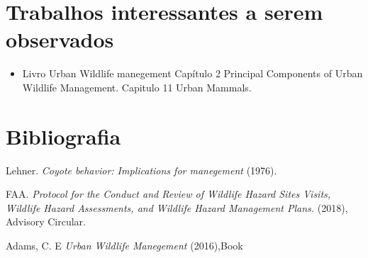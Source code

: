 \documentclass[a4paper,16,onecolumn]{article}
\begin{document}

\section{Trabalhos interessantes a serem observados}
\begin{itemize}
\item Livro Urban Wildlife manegement
\subitem Capítulo 2 Principal Components of Urban Wildlife Management.
\subitem Capitulo 11 Urban Mammals.

\end{itemize}

\section{Bibliografia}
\begin{thebibliography}{10}

 Lehner.
\textit{Coyote behavior: Implications for manegement}
(1976).

FAA.
\textit{Protocol for the Conduct and Review of Wildlife Hazard Sites Visits, Wildlife Hazard Assessments, and Wildlife Hazard Management Plans.} 
(2018), Advisory Circular.

Adams, C. E
\textit{Urban Wildlife Manegement}
(2016),Book

\end{thebibliography}
\end{document}

